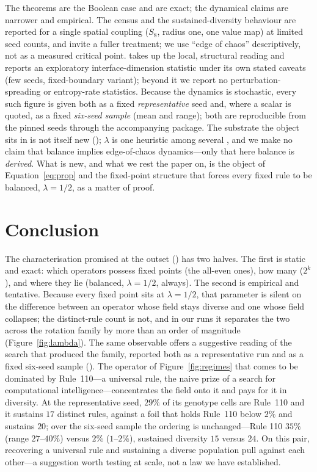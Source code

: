 \documentclass[man,12pt,floatsintext]{apa7}
\newcommand{\secref}[1]{\emph{\nameref{#1}}}
\begin{document}
The theorems are the Boolean case and are exact; the dynamical claims are
narrower and empirical. The census and the sustained-diversity behaviour are
reported for a single spatial coupling ($S_8$, radius one, one value map) at
limited seed counts, and invite a fuller treatment; we use ``edge of chaos''
descriptively, not as a measured critical point. \secref{sec:discussion}
takes up the local, structural reading and reports an exploratory
interface-dimension statistic under its own stated caveats (few seeds,
fixed-boundary variant); beyond it we report no perturbation-spreading or
entropy-rate statistics.
Because the dynamics is stochastic, every such figure is given both as a
fixed \emph{representative} seed and, where a scalar is quoted, as a fixed
\emph{six-seed sample} (mean and range); both are reproducible from the
pinned seeds through the accompanying package. The
substrate the object sits in is not itself new (\secref{sec:object}); $\lambda$
is one heuristic among several \parencite{wuensche1999classifying}, and we
make no claim that balance implies edge-of-chaos dynamics---only that here
balance is \emph{derived}. What is new, and what we rest the paper on, is the
object of Equation~\eqref{eq:prop} and the fixed-point structure that forces
every fixed rule to be balanced, $\lambda = 1/2$, as a matter of proof.

\section{Conclusion}
\label{sec:conclusion}

The characterisation promised at the outset (\secref{sec:object}) has two
halves. The
first is static and exact: which operators possess fixed points (the
all-even ones), how many ($2^k$), and where they lie (balanced,
$\lambda = 1/2$, always). The second is empirical and tentative. Because
every fixed point sits at $\lambda = 1/2$, that parameter is silent on the
difference between an operator whose field stays diverse and one whose field
collapses; the distinct-rule count is not, and in our
runs it separates the two across the rotation family by more than an order of
magnitude (Figure~\ref{fig:lambda}). The same observable offers a suggestive
reading of the search that produced the family, reported both as a
representative run and as a fixed six-seed sample (\secref{sec:limits}). The
operator of Figure~\ref{fig:regimes} that comes to be dominated by
Rule~110---a universal rule, the naive prize of a search for computational
intelligence---concentrates the field onto it and pays for it in diversity.
At the representative seed, $29\%$ of its genotype cells are Rule~110 and it
sustains $17$ distinct rules, against a foil that holds Rule~110 below $2\%$
and sustains $20$; over the six-seed sample the ordering is unchanged---Rule
110 $35\%$ (range $27$--$40\%$) versus $2\%$ ($1$--$2\%$), sustained diversity
$15$ versus $24$. On this pair, recovering a universal rule and sustaining a
diverse population pull against each other---a suggestion worth testing at
scale, not a law we have established.

\printbibliography
\end{document}
